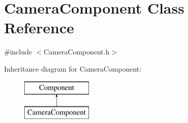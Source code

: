 \hypertarget{class_camera_component}{}\section{Camera\+Component Class Reference}
\label{class_camera_component}


{\ttfamily \#include $<$Camera\+Component.\+h$>$}

Inheritance diagram for Camera\+Component\+:\begin{figure}[H]
\begin{center}
\leavevmode
\includegraphics[height=2.000000cm]{class_camera_component}
\end{center}
\end{figure}
